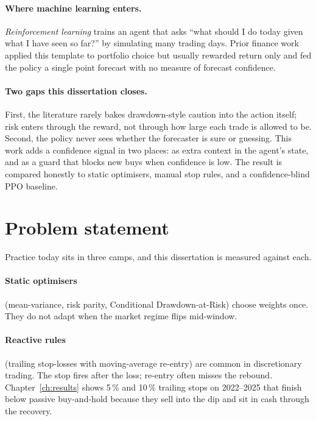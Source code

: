 \paragraph{Where machine learning enters.} \emph{Reinforcement learning} trains an agent that asks ``what should I do today given what I have seen so far?'' by simulating many trading days. Prior finance work~\parencite{jiang2017deep,yang2020deep,liu2021finrl} applied this template to portfolio choice but usually rewarded return only and fed the policy a single point forecast with no measure of forecast confidence.

\paragraph{Two gaps this dissertation closes.} First, the literature rarely bakes drawdown-style caution into the action itself; risk enters through the reward, not through how large each trade is allowed to be. Second, the policy never sees whether the forecaster is sure or guessing. This work adds a confidence signal in two places: as extra context in the agent's state, and as a guard that blocks new buys when confidence is low. The result is compared honestly to static optimisers, manual stop rules, and a confidence-blind PPO baseline.

\section{Problem statement}
\label{sec:problem_statement}

Practice today sits in three camps, and this dissertation is measured against each.

\paragraph{Static optimisers} (mean-variance, risk parity, Conditional Drawdown-at-Risk) choose weights once. They do not adapt when the market regime flips mid-window.

\paragraph{Reactive rules} (trailing stop-losses with moving-average re-entry) are common in discretionary trading. The stop fires after the loss; re-entry often misses the rebound. Chapter~\ref{ch:results} shows 5\,\% and 10\,\% trailing stops on 2022--2025 that finish below passive buy-and-hold because they sell into the dip and sit in cash through the recovery.

